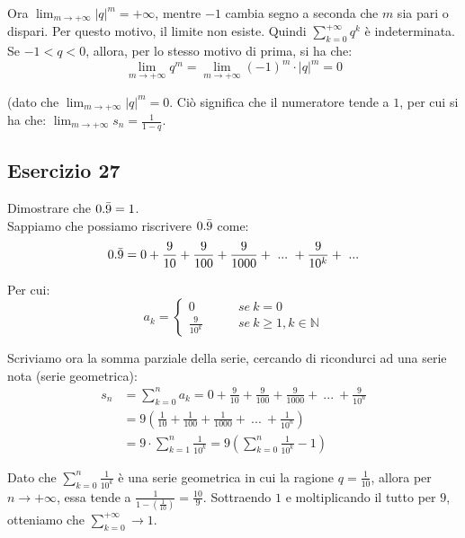 \documentclass{article}
\begin{document}
\noindent Ora $\lim_{m \to +\infty} |q|^m = +\infty$, mentre $-1$ cambia segno a seconda che $m$ sia pari o dispari. Per questo motivo, il limite non esiste. Quindi $\sum_{k = 0}^{+\infty} q^k$ è indeterminata.\\
Se $-1 < q < 0$, allora, per lo stesso motivo di prima, si ha che:
\begin{equation*}
    \lim_{m \to +\infty} q^m = \lim_{m \to +\infty} (-1)^m \cdot |q|^m = 0
\end{equation*}

\noindent (dato che $\lim_{m \to +\infty} |q|^m = 0$. Ciò significa che il numeratore tende a $1$, per cui si ha che: $\lim_{m \to +\infty} s_n = \frac{1}{1 - q}$.

\subsection{Esercizio 27}
Dimostrare che $0.\Bar{9} = 1$.\\
Sappiamo che possiamo riscrivere $0.\Bar{9}$ come:
\begin{equation*}
    0.\Bar{9} = 0 + \frac{9}{10} + \frac{9}{100} + \frac{9}{1000} + \ ... \ + \frac{9}{10^k} + \ ...
\end{equation*}

\noindent Per cui:
\begin{equation*}
    a_k = \begin{cases}
    0 \qquad & se \ k = 0 \\
    \frac{9}{10^k} \qquad & se \ k \geq 1, k \in \mathbb{N}
\end{cases}
\end{equation*}

\noindent Scriviamo ora la somma parziale della serie, cercando di ricondurci ad una serie nota (serie geometrica):
\begin{align*}
    s_n &= \sum_{k = 0}^n a_k = 0 + \frac{9}{10} + \frac{9}{100} + \frac{9}{1000} + \ ... \ + \frac{9}{10^n} \\
    &= 9\left(\frac{1}{10} + \frac{1}{100} + \frac{1}{1000} + \ ... \ + \frac{1}{10^n} \right) \\
    &= 9 \cdot \sum_{k = 1}^n \frac{1}{10^k} = 9 \left(\sum_{k = 0}^n \frac{1}{10^k} - 1\right)
\end{align*}

\noindent Dato che $\sum_{k = 0}^n \frac{1}{10^k}$ è una serie geometrica in cui la ragione $q = \frac{1}{10}$, allora per $n \to +\infty$, essa tende a $\frac{1}{1 - (\frac{1}{10})} = \frac{10}{9}$. Sottraendo $1$ e moltiplicando il tutto per $9$, otteniamo che $\sum_{k = 0}^{+\infty} \to 1$.\\
\end{document}
